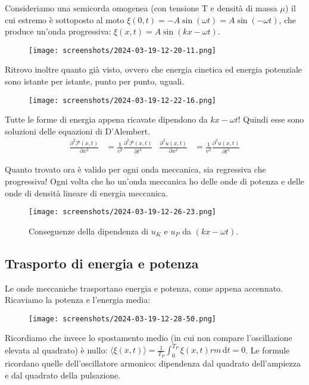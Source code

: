 \begin{eg}
	Consideriamo una semicorda omogenea (con tensione T e densità di massa \(\mu \)) il cui estremo è sottoposto al moto \(\xi (0,t) = -A \sin(\omega t)= A \sin (-\omega t)\), che produce un'onda progressiva: \(\xi (x,t) = A \sin (kx - \omega t)\).
	\begin{figure}[H]
		\centering
		\texttt{[image: screenshots/2024-03-19-12-20-11.png]}
	\end{figure}
	Ritrovo inoltre quanto già visto, ovvero che energia cinetica ed energia potenziale sono istante per istante, punto per punto, uguali.
	\begin{figure}[H]
		\centering
		\texttt{[image: screenshots/2024-03-19-12-22-16.png]}
	\end{figure}
	Tutte le forme di energia appena ricavate dipendono da \(kx-\omega t\)! Quindi esse sono soluzioni delle equazioni di D'Alembert.
	\begin{align}
		\frac{\partial ^{2} \mathcal{P} (x,t)}{\partial x^{2} } &= \frac{1}{v^{2} }\frac{\partial ^{2} \mathcal{P} (x,t)}{\partial t^{2} }
		&
		\frac{\partial ^{2} u (x,t)}{\partial x^{2} } &= \frac{1}{v^{2} }\frac{\partial ^{2} u(x,t)}{\partial t^{2} }  
	\end{align}
\end{eg}
Quanto trovato ora è valido per ogni onda meccanica, sia regressiva che progressiva! Ogni volta che ho un'onda meccanica ho delle onde di potenza e delle onde di densità lineare di energia meccanica.
\begin{figure}[H]
	\centering
	\texttt{[image: screenshots/2024-03-19-12-26-23.png]}
	\caption{Conseguenze della dipendenza di \(u_K\) e \(u_P\) da \((kx-\omega t)\).}
\end{figure}

\subsection{Trasporto di energia e potenza}
Le onde meccaniche trasportano energia e potenza, come appena accennato. Ricaviamo la potenza e l'energia media:
\begin{figure}[H]
	\centering
	\texttt{[image: screenshots/2024-03-19-12-28-50.png]}
\end{figure}
Ricordiamo che invece lo spostamento medio (in cui non compare l'oscillazione elevata al quadrato) è nullo: \(\langle \xi (x,t)\rangle  = \frac{1}{T_P} \int_{0}^{T_P} \xi (x,t)rm  \,\mathrm{d}t =0\).
Le formule ricordano quelle dell'oscillatore armonico: dipendenza dal quadrato dell'ampiezza e dal quadrato della pulsazione.
